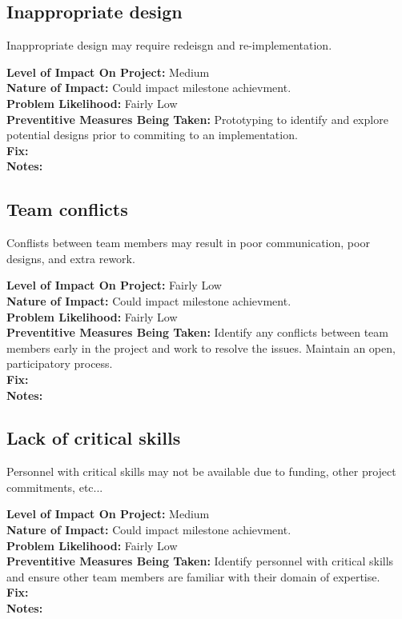 \documentclass[english]{article}
\newcommand{\sreq}[1]{\subsection{\hspace{.2in}#1}}
\newenvironment
{reqlist}
{\begin{list} {} {} \rm \item[]}
{\end{list}}
\begin{document}
\sreq{Inappropriate design}
Inappropriate design may require redeisgn and re-implementation.
\begin{reqlist}
{\bf Level of Impact On Project:} Medium \\
{\bf Nature of Impact:} Could impact milestone achievment.\\
{\bf Problem Likelihood:} Fairly Low \\
{\bf Preventitive Measures Being Taken:}
Prototyping to identify and explore potential designs prior to commiting to
an implementation.
\\
{\bf Fix:}\\
{\bf Notes:} 
\end{reqlist}

\sreq{Team conflicts}
Conflists between team members may result in poor communication, poor designs,
and extra rework.
\begin{reqlist}
{\bf Level of Impact On Project:} Fairly Low \\
{\bf Nature of Impact:} Could impact milestone achievment.\\
{\bf Problem Likelihood:} Fairly Low \\
{\bf Preventitive Measures Being Taken:}
Identify any conflicts between team members early in the project and work to
resolve the issues. Maintain an open, participatory process.
\\
{\bf Fix:}\\
{\bf Notes:} 
\end{reqlist}

\sreq{Lack of critical skills}
Personnel with critical skills may not be available due to funding, other
project commitments, etc...
\begin{reqlist}
{\bf Level of Impact On Project:} Medium \\
{\bf Nature of Impact:} Could impact milestone achievment.\\
{\bf Problem Likelihood:} Fairly Low \\
{\bf Preventitive Measures Being Taken:}
Identify personnel with critical skills and ensure other team
members are familiar with their domain of expertise.
\\
{\bf Fix:}\\
{\bf Notes:} 
\end{reqlist}
\end{document}
